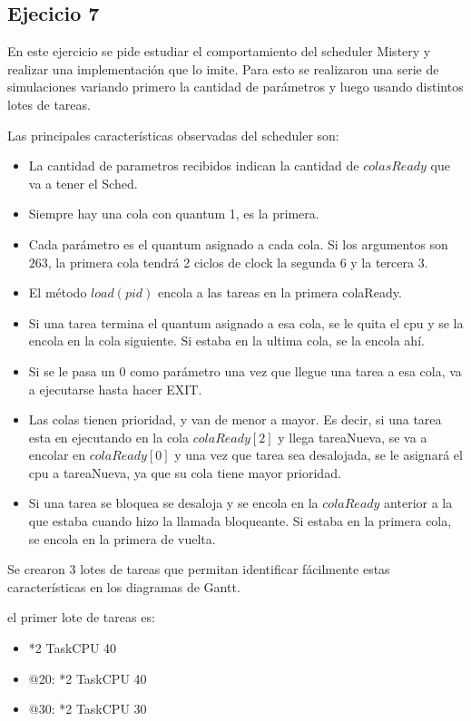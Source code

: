 \newpage
\subsection{Ejecicio 7}

En este ejercicio se pide estudiar el comportamiento del scheduler Mistery y realizar una implementación que lo imite.
Para esto se realizaron una serie de simulaciones variando primero la cantidad de parámetros y luego usando distintos lotes de tareas.

Las principales características observadas del scheduler son:
\begin{itemize}
\item La cantidad de parametros recibidos indican la cantidad de $colasReady$ que va a tener el Sched.
\item Siempre hay una cola con quantum 1, es la primera.
\item Cada parámetro es el quantum asignado a cada cola. Si los argumentos son $2 6 3$, la primera cola tendrá 2 ciclos de clock
la segunda 6 y la tercera 3.
\item El método $load(pid)$ encola a las tareas en la primera colaReady. 
\item Si una tarea termina el quantum asignado a esa cola, se le quita el cpu y se la encola en la cola siguiente. Si estaba en la ultima cola, se la encola ahí.
\item Si se le pasa un 0 como parámetro una vez que llegue una tarea a esa cola, va a ejecutarse hasta hacer EXIT.
\item Las colas tienen prioridad, y van de menor a mayor. Es decir, si una tarea esta en ejecutando en la cola $colaReady[2]$ y llega tareaNueva, se va a encolar
en $colaReady[0]$ y una vez que tarea sea desalojada, se le asignará el cpu a tareaNueva, ya que su cola tiene mayor prioridad.
\item Si una tarea se bloquea se desaloja y se encola en la $colaReady$ anterior a la que estaba cuando hizo la llamada bloqueante. Si estaba en la primera cola,
se encola en la primera de vuelta.
\end{itemize}


Se crearon 3 lotes de tareas que permitan identificar fácilmente estas características en los diagramas de Gantt.

el primer lote de tareas es:

\begin{itemize}

\item *2 TaskCPU 40
\item @20:
 *2 TaskCPU 40
\item @30:
*2 TaskCPU 30

\end{itemize}

